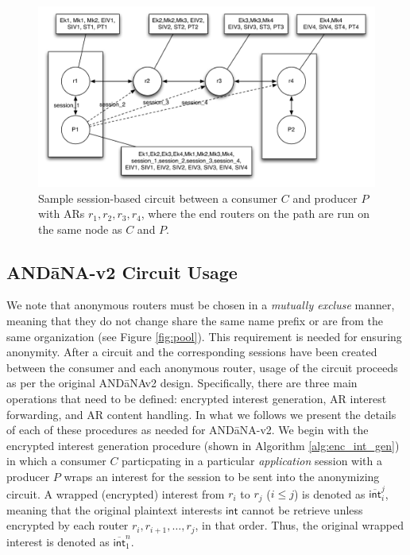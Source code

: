 \begin{figure}[ht!]
\begin{center}
\includegraphics[scale=0.5]{./images/circuit.pdf}
\end{center}
\caption{Sample session-based circuit between a consumer $C$ and producer $P$ with ARs $r_1,r_2,r_3,r_4$, where the end routers on the path are run on the same node as $C$ and $P$.}
\label{fig:circuit}
\end{figure}

\subsection{AND\=aNA-v2 Circuit Usage}

We note that anonymous routers must be chosen in a \emph{mutually excluse} manner, meaning that they do not change share the same name prefix or are from the same organization (see Figure \ref{fig:pool}). This requirement is needed for ensuring anonymity. After a circuit and the corresponding sessions have been created between the consumer and each anonymous router, usage of the circuit proceeds as per the original {\sf AND\=aNAv2} design. Specifically, there are three main operations that need to be defined: encrypted interest generation, AR interest forwarding, and AR content handling. In what we follows we present the details of each of these procedures as needed for {\sf AND\=aNA-v2}. We begin with the encrypted interest generation procedure (shown in Algorithm \ref{alg:enc_int_gen}) in which a consumer $C$ particpating in a particular \emph{application} session with a producer $P$ wraps an interest for the session to be sent into the anonymizing circuit. A wrapped (encrypted) interest from $r_i$ to $r_j$ ($i \leq j$) is denoted as $\overline{\mathsf{int}}_i^j$, meaning that the original plaintext interests $\mathsf{int}$ cannot be retrieve unless encrypted by each router $r_i,r_{i+1},\dots,r_j$, in that order. Thus, the original wrapped interest is denoted as $\overline{\mathsf{int}}_1^n$.

